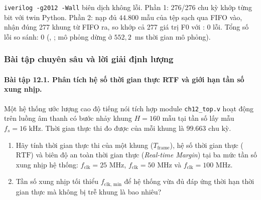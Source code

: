 \begin{tcolorbox}[colback=green!4,colframe=green!45!black,title={Kết quả Icarus Verilog 12 (người bình duyệt chạy trên Linux)}]
\texttt{iverilog -g2012 -Wall} biên dịch không lỗi. Phần 1: 276/276 chu kỳ khớp từng bit với twin Python. Phần 2: nạp đủ $44.800$ mẫu của tệp sạch qua FIFO vào, nhận đúng 277 khung từ FIFO ra, so khớp cả 277 giá trị F0 với : 0 lỗi. Tổng số lỗi so sánh: 0 (, ; mô phỏng dừng ở $552{,}2$~ms thời gian mô phỏng).
\end{tcolorbox}

\subsubsection*{Bài tập chuyên sâu và lời giải định lượng}

\paragraph{Bài tập 12.1. Phân tích hệ số thời gian thực RTF và giới hạn tần số xung nhịp.}
Một hệ thống ước lượng cao độ tiếng nói tích hợp module \texttt{ch12\_top.v} hoạt động trên luồng âm thanh có bước nhảy khung $H = 160\text{ mẫu}$ tại tần số lấy mẫu $f_s = 16\text{ kHz}$. Thời gian thực thi đo được của mỗi khung là $99.663\text{ chu kỳ}$.
\begin{enumerate}[label=(\alph*)]
    \item Hãy tính thời gian thực thi của một khung ($T_{\text{frame}}$), hệ số thời gian thực ($\text{RTF}$) và biên độ an toàn thời gian thực (\emph{Real-time Margin}) tại ba mức tần số xung nhịp hệ thống: $f_{\text{clk}} = 25\text{ MHz}$, $f_{\text{clk}} = 50\text{ MHz}$ và $f_{\text{clk}} = 100\text{ MHz}$.
    \item Tần số xung nhịp tối thiểu $f_{\text{clk, min}}$ để hệ thống vừa đủ đáp ứng thời hạn thời gian thực mà không bị trễ khung là bao nhiêu?
\end{enumerate}

